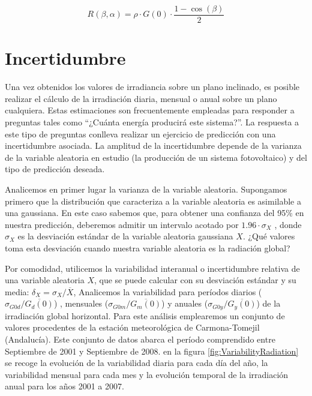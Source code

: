 \begin{equation}
  R(\beta,\alpha)=\rho\cdot G(0)\cdot\frac{1-\cos(\beta)}{2}\label{eq:Albedo}\end{equation}



\section{Incertidumbre}

Una vez obtenidos los valores de irradiancia sobre un plano inclinado,
es posible realizar el cálculo de la irradiación diaria, mensual o
anual sobre un plano cualquiera. Estas estimaciones son frecuentemente
empleadas para responder a preguntas tales como {}``¿Cuánta energía
producirá este sistema?''. La respuesta a este tipo de preguntas
conlleva realizar un ejercicio de predicción con una incertidumbre
asociada. La amplitud de la incertidumbre depende de la varianza de
la variable aleatoria en estudio (la producción de un sistema fotovoltaico)
y del tipo de predicción deseada. 

Analicemos en primer lugar la varianza de la variable aleatoria. Supongamos
primero que la distribución que caracteriza a la variable aleatoria
es asimilable a una gaussiana. En este caso sabemos que, para obtener
una confianza del 95\% en nuestra predicción, deberemos admitir un
intervalo acotado por $1.96\cdot\sigma_{X}$ , donde $\sigma_{X}$
es la desviación estándar de la variable aleatoria gaussiana $X$.
¿Qué valores toma esta desviación cuando nuestra variable aleatoria
es la radiación global?

Por comodidad, utilicemos la variabilidad interanual o incertidumbre
relativa de una variable aleatoria $X$, que se puede calcular con
su desviación estándar y su media: $\delta_{X}=\sigma_{X}/\overline{X}$,
Analicemos la variabilidad para períodos diarios ($\sigma_{G0d}/\overline{G_{d}(0)}$)
, mensuales ($\sigma_{G0m}/\overline{G_{m}(0)}$) y anuales ($\sigma_{G0y}/\overline{G_{y}(0)}$)
de la irradiación global horizontal. Para este análisis emplearemos
un conjunto de valores procedentes de la estación meteorológica de
Carmona-Tomejil (Andalucía). Este conjunto de datos abarca el período
comprendido entre Septiembre de 2001 y Septiembre de 2008. en la figura
\ref{fig:VariabilityRadiation} se recoge la evolución de la variabilidad
diaria para cada día del año, la variabilidad mensual para cada mes
y la evolución temporal de la irradiación anual para los años 2001
a 2007.

